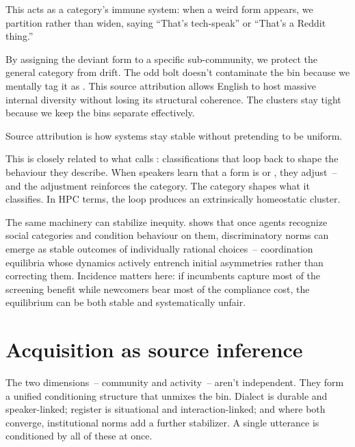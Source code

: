 This acts as a category's immune system: when a weird form appears, we partition rather than widen, saying \enquote{That's tech-speak} or \enquote{That's a Reddit thing.}

By assigning the deviant form to a specific sub-community, we protect the general category from drift. The odd bolt doesn't contaminate the bin because we mentally tag it as . This source attribution allows English to host massive internal diversity without losing its structural coherence. The clusters stay tight because we keep the bins separate effectively.

Source attribution is how systems stay stable without pretending to be uniform.

This is closely related to what \textcite{hacking1999} calls : classifications that loop back to shape the behaviour they describe. When speakers learn that a form is  or , they adjust~-- and the adjustment reinforces the category. The category shapes what it classifies. In HPC terms, the loop produces an extrinsically homeostatic cluster.

The same machinery can stabilize inequity. \textcite{oconnor2022contracts} shows that once agents recognize social categories and condition behaviour on them, discriminatory norms can emerge as stable outcomes of individually rational choices~-- coordination equilibria whose dynamics actively entrench initial asymmetries rather than correcting them.
Incidence matters here: if incumbents capture most of the screening benefit while newcomers bear most of the compliance cost, the equilibrium can be both stable and systematically unfair.

\section{Acquisition as source inference}
\label{sec:16:acquisition}

The two dimensions~-- community and activity~-- aren't independent. They form a unified conditioning structure that unmixes the bin. Dialect is durable and speaker-linked; register is situational and interaction-linked; and where both converge, institutional norms add a further stabilizer. A single utterance is conditioned by all of these at once.

